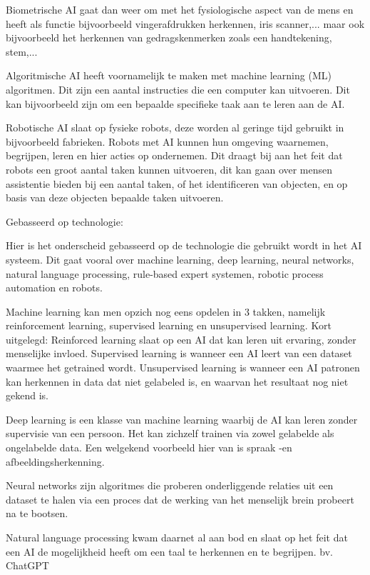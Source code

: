     Biometrische AI gaat dan weer om met het fysiologische aspect van de mens en heeft als functie bijvoorbeeld vingerafdrukken herkennen, iris scanner,... maar ook bijvoorbeeld het herkennen van gedragskenmerken zoals een handtekening, stem,... 
    
    Algoritmische AI heeft voornamelijk te maken met machine learning (ML) algoritmen. Dit zijn een aantal instructies die een computer kan uitvoeren. Dit kan bijvoorbeeld zijn om een bepaalde specifieke taak aan te leren aan de AI.

    Robotische AI slaat op fysieke robots, deze worden al geringe tijd gebruikt in bijvoorbeeld fabrieken. Robots met AI kunnen hun omgeving waarnemen, begrijpen, leren en hier acties op ondernemen. Dit draagt bij aan het feit dat robots een groot aantal taken kunnen uitvoeren, dit kan gaan over mensen assistentie bieden bij een aantal taken, of het identificeren van objecten, en op basis van deze objecten bepaalde taken uitvoeren.

Gebasseerd op technologie:

    Hier is het onderscheid gebasseerd op de technologie die gebruikt wordt in het AI systeem. Dit gaat vooral over machine learning, deep learning, neural networks, natural language processing, rule-based expert systemen, robotic process automation en robots.
    
    Machine learning kan men opzich nog eens opdelen in 3 takken, namelijk reinforcement learning, supervised learning en unsupervised learning.
    Kort uitgelegd: Reinforced learning slaat op een AI dat kan leren uit ervaring, zonder menselijke invloed. Supervised learning is wanneer een AI leert van een dataset waarmee het getrained wordt. Unsupervised learning is wanneer een AI patronen kan herkennen in data dat niet gelabeled is, en waarvan het resultaat nog niet gekend is.
    
    Deep learning is een klasse van machine learning waarbij de AI kan leren zonder supervisie van een persoon. Het kan zichzelf trainen via zowel gelabelde als ongelabelde data. Een welgekend voorbeeld hier van is spraak -en afbeeldingsherkenning.
    
    Neural networks zijn algoritmes die proberen onderliggende relaties uit een dataset te halen via een proces dat de werking van het menselijk brein probeert na te bootsen.
    
    Natural language processing kwam daarnet al aan bod en slaat op het feit dat een AI de mogelijkheid heeft om een taal te herkennen en te begrijpen. bv. ChatGPT
    
